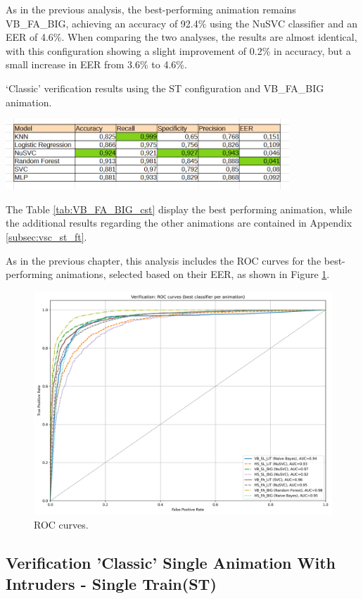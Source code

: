\documentclass[12pt]{report}
\begin{document}
As in the previous analysis, the best-performing animation remains VB\_FA\_BIG, achieving an accuracy of 92.4\% using the NuSVC classifier and an EER of 4.6\%.
When comparing the two analyses, the results are almost identical, with this configuration showing a slight improvement of 0.2\% in accuracy, but a small increase in EER from 3.6\% to 4.6\%.

\begin{table}[ht]
    \centering
    \caption{‘Classic’ verification results using the ST configuration and VB\_FA\_BIG animation.}
    \includegraphics[width=0.8\textwidth]{Images/Results/Classic_procedure/Verification_single/st/VB_FA_BIG.png}
    \label{tab:VB_FA_BIG_cst}
\end{table}

The Table \ref{tab:VB_FA_BIG_cst} display the best performing animation, while the additional results regarding the other animations are contained in Appendix \ref{subsec:vsc_st_ft}.

As in the previous chapter, this analysis includes the ROC curves for the best-performing animations, selected based on their EER, as shown in Figure \ref{fig:roc_cst}.

\begin{figure}[ht]
    \centering
    \includegraphics[width = 0.6
    \textwidth]{Images/Results/Classic_procedure/Verification_single/st/Verification_single_roc_classic_st.png}
    \caption{ROC curves.}
    \label{fig:roc_cst}
\end{figure}
\FloatBarrier


\subsection{Verification 'Classic' Single Animation With Intruders - Single Train(ST)}
\end{document}
